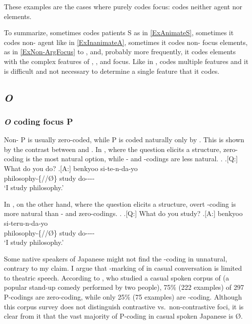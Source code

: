 These examples are the cases where  purely codes focus:
 codes neither agent nor  elements.


To summarize,
 sometimes codes  patients S as in \ref{ExAnimateS},
sometimes it codes non- agent like in \ref{ExInanimateA},
sometimes it codes non-  focus elements, as in \ref{ExNon-ArgFocus} to \Last, and,
probably more frequently,
it codes elements with the complex features of , , and focus.
Like  in ,
 codes multiple features and it is difficult and not necessary to determine a single feature that it codes.


\subsection{\textit{O}}

\subsubsection{\textit{O} coding focus P}

Non- P is usually zero-coded,
while  P is coded naturally only by .
This is shown by the contrast between \Next and \NNext.
In \Next,
where the question elicits a  structure,
zero-coding is the most natural option,
while - and -codings are less natural.
%
\ex.\label{ExfocusP}
	\a.[Q:] What do you do?
	\bg.[A:]  benkyoo si-te-n-da-yo \\
		philosophy-\{//\O\} study do---- \\
		`I study philosophy.'

In \Next,
on the other hand,
where the question elicits a  structure,
overt -coding is more natural than - and zero-codings.
%
\ex. 
	\a.[Q:] What do you study?
	\bg.[A:]  benkyoo si-teru-n-da-yo \\
		philosophy-\{//\O\} study do---- \\
		`I study philosophy.'


Some native speakers of Japanese might not find the -coding in \LLast unnatural, contrary to my claim.
I argue that -marking of  in casual conversation
is limited to theatric speech.
According to ,
who studied a casual spoken corpus of 
(a popular stand-up comedy performed by two people),
75\% (222 examples) of 297 P-codings are zero-coding,
while only 25\% (75 examples) are -coding.
Although this corpus survey does not distinguish contrastive vs.\ non-contrastive foci,
it is clear from it that the vast majority of P-coding in casual spoken Japanese is {\O}.

